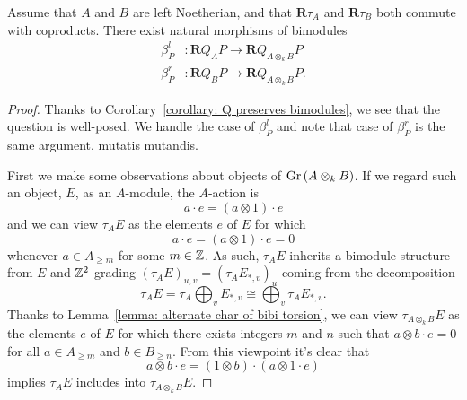 \begin{corollary} \label{corollary: natural maps between Qs}
    Assume that \(A\) and \(B\) are left Noetherian, and that \(\mathbf{R}\tau_A\) and \(\mathbf{R}\tau_B\) both commute with coproducts. There exist natural morphisms of bimodules 
  \begin{align*}
    \beta^l_P & : \mathbf{R}Q_{A} P \to \mathbf{R}Q_{A \otimes_k B} P \\
    \beta^r_P & : \mathbf{R}Q_{B} P \to \mathbf{R}Q_{A \otimes_k B} P.
  \end{align*}
\end{corollary}

\begin{proof}%
  Thanks to Corollary~\ref{corollary: Q preserves bimodules}, we see that the question is well-posed. We handle the case of \(\beta^l_P\) and note that case of \(\beta^r_P\) is the same argument, mutatis mutandis.

  First we make some observations about objects of \(\operatorname{Gr}\left(A \otimes_k B\right)\).
  If we regard such an object, \(E\), as an \(A\)-module, the \(A\)-action is
  \[a \cdot e = (a \otimes 1) \cdot e\]
  and we can view \(\tau_A E\) as the elements \(e\) of \(E\) for which
  \[a \cdot e = (a \otimes 1) \cdot e = 0\]
  whenever \(a \in A_{\geq m}\) for some \(m \in \mathbb{Z}\).
  As such, \(\tau_A E\) inherits a bimodule structure from \(E\) and \(\mathbb{Z}^2\)-grading \((\tau_A E)_{u,v} = (\tau_A E_{*,v})_u\) coming from the decomposition
  \[\tau_A E = \tau_A \bigoplus_v E_{\ast,v} \cong \bigoplus_v \tau_A E_{\ast,v}.\]
  Thanks to Lemma~\ref{lemma: alternate char of bibi torsion}, we can view \(\tau_{A \otimes_k B} E\) as the elements \(e\) of \(E\) for which there exists integers \(m\) and \(n\) such that \(a \otimes b \cdot e = 0\) for all \(a \in A_{\geq m}\) and \(b \in B_{\geq n}\).
  From this viewpoint it's clear that
  \[a \otimes b \cdot e = (1 \otimes b) \cdot (a \otimes 1 \cdot e)\]
  implies \(\tau_A E\) includes into \(\tau_{A \otimes_k B} E\).


\end{proof}
